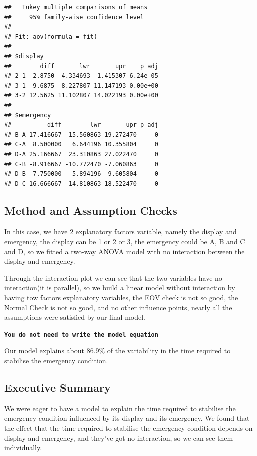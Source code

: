 \documentclass[
]{article}
\begin{document}
\begin{verbatim}
##   Tukey multiple comparisons of means
##     95% family-wise confidence level
## 
## Fit: aov(formula = fit)
## 
## $display
##        diff       lwr       upr    p adj
## 2-1 -2.8750 -4.334693 -1.415307 6.24e-05
## 3-1  9.6875  8.227807 11.147193 0.00e+00
## 3-2 12.5625 11.102807 14.022193 0.00e+00
## 
## $emergency
##          diff        lwr       upr p adj
## B-A 17.416667  15.560863 19.272470     0
## C-A  8.500000   6.644196 10.355804     0
## D-A 25.166667  23.310863 27.022470     0
## C-B -8.916667 -10.772470 -7.060863     0
## D-B  7.750000   5.894196  9.605804     0
## D-C 16.666667  14.810863 18.522470     0
\end{verbatim}

\hypertarget{method-and-assumption-checks-1}{%
\subsection{Method and Assumption
Checks}\label{method-and-assumption-checks-1}}

In this case, we have 2 explanatory factors variable, namely the display
and emergency, the display can be 1 or 2 or 3, the emergency could be A,
B and C and D, so we fitted a two-way ANOVA model with no interaction
between the display and emergency.

Through the interaction plot we can see that the two variables have no
interaction(it is parallel), so we build a linear model without
interaction by having tow factors explanatory variables, the EOV check
is not so good, the Normal Check is not so good, and no other influence
points, nearly all the assumptions were satisfied by our final model.

\textbf{\texttt{You\ do\ not\ need\ to\ write\ the\ model\ equation}}

Our model explains about 86.9\% of the variability in the time required
to stabilise the emergency condition.

\hypertarget{executive-summary-1}{%
\subsection{Executive Summary}\label{executive-summary-1}}

We were eager to have a model to explain the time required to stabilise
the emergency condition influenced by its display and its emergency. We
found that the effect that the time required to stabilise the emergency
condition depends on display and emergency, and they've got no
interaction, so we can see them individually.
\end{document}
